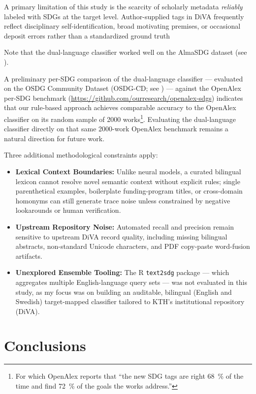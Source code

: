 A primary limitation of this study is the scarcity of scholarly metadata \textit{reliably} labeled with \glspl{SDG} at the target level. Author-supplied tags in \gls{DiVA} frequently reflect disciplinary self-identification, broad motivating premises, or occasional deposit errors rather than a standardized ground truth

Note that the dual-language classifier worked well on the AlmaSDG dataset (see ).

A preliminary per-\gls{SDG} comparison of the dual-language classifier --- evaluated on the OSDG Community Dataset (OSDG-CD; see ) --- against the OpenAlex per-\gls{SDG} benchmark (\url{https://github.com/ourresearch/openalex-sdgs}) indicates that our rule-based approach achieves comparable accuracy to the OpenAlex classifier on its random sample of \num{2000} works\footnote{For which OpenAlex reports that \enquote{the new SDG tags are right \qty{68}{\percent} of the time and find \qty{72}{\percent} of the goals the works address.}}. Evaluating the dual-language classifier directly on that same \num{2000}-work OpenAlex benchmark remains a natural direction for future work.

Three additional methodological constraints apply:
\begin{itemize}
  \item \textbf{Lexical Context Boundaries:} Unlike neural models, a curated bilingual lexicon cannot resolve novel semantic context without explicit rules; single parenthetical examples, boilerplate funding-program titles, or cross-domain homonyms can still generate trace noise unless constrained by negative lookarounds or human verification.
  
  \item \textbf{Upstream Repository Noise:} Automated recall and precision remain sensitive to upstream \gls{DiVA} record quality, including missing bilingual abstracts, non-standard Unicode characters, and PDF copy-paste word-fusion artifacts.
  
  \item \textbf{Unexplored Ensemble Tooling:} The R \texttt{text2sdg} package --- which aggregates multiple English-language query sets --- was not evaluated in this study, as my focus was on building an auditable, bilingual (English and Swedish) target-mapped classifier tailored to \gls{KTH}'s institutional repository (\ie \gls{DiVA}).
\end{itemize}
\clearpage
\section{Conclusions}
\label{sec:Conclusions}

